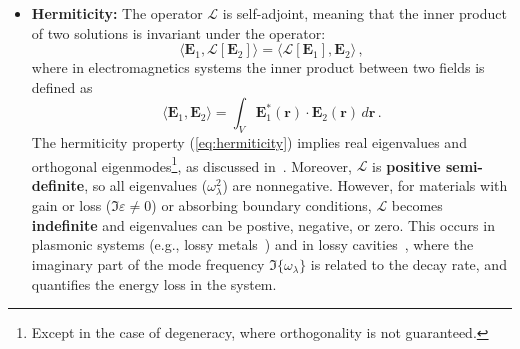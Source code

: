 \begin{itemize}
        \item \textbf{Hermiticity:} The operator $\mathcal{L}$ is self-adjoint,
              meaning that the inner product of two solutions is invariant under the
              operator:
              \begin{equation}\label{eq:hermiticity}
                \langle \mathbf{E}_1, \mathcal{L}[\mathbf{E}_2] \rangle = \langle \mathcal{L}[\mathbf{E}_1], \mathbf{E}_2 \rangle\,,
            \end{equation}
            where in electromagnetics systems the inner product between two fields is defined as
            \begin{equation}
                \langle \mathbf{E}_1, \mathbf{E}_2 \rangle = \int_V \mathbf{E}_1^*(\mathbf{r}) \cdot \mathbf{E}_2(\mathbf{r}) \, d\mathbf{r}\,.
            \end{equation}
              The hermiticity property (\eqref{eq:hermiticity}) implies real eigenvalues and orthogonal eigenmodes\footnote{Except in
                  the case of degeneracy, where orthogonality is not guaranteed.}, as discussed
              in~\cite{phot_crys}.
              Moreover, $\mathcal{L}$ is \textbf{positive semi-definite}, so all
              eigenvalues ($\omega_\lambda^2$) are nonnegative. However, for materials with
              gain or loss
              ($\Im{\varepsilon} \neq 0$) or absorbing boundary conditions, $\mathcal{L}$
              becomes \textbf{indefinite} and eigenvalues can be postive, negative, or zero. This occurs in plasmonic
              systems
              (e.g., lossy metals~\cite{ownpub0}) and in lossy cavities~\cite{ownpub4},
              where the imaginary part of the mode frequency $\Im\{\omega_\lambda\}$ is
              related to the decay rate, and quantifies the energy loss in the system.



\end{itemize}
